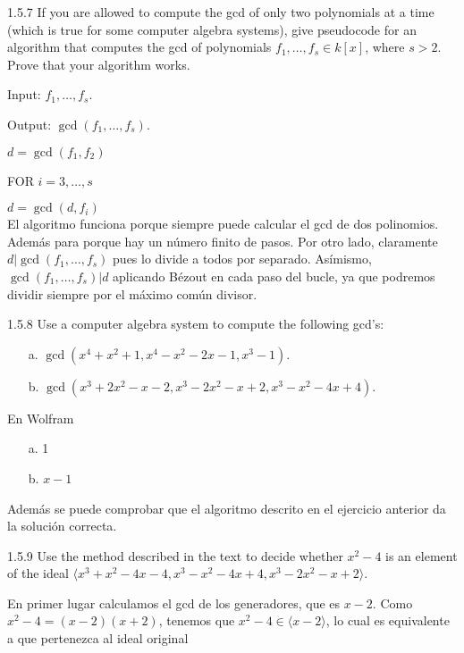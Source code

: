 \documentclass[twoside]{article}
\begin{document}
\newpage

\begin{ejercicio}{1.5.7}
If you are allowed to compute the gcd of only two polynomials at a time (which is true
for some computer algebra systems), give pseudocode for an algorithm that computes
the gcd of polynomials $f_1,\dots, f_s ∈ k[x]$, where $s > 2$. Prove that your algorithm works.
\end{ejercicio}
\begin{solucion}
Input: $f_1,\dots, f_s$.

Output: $\gcd(f_1,\dots, f_s)$.

$d=\gcd(f_1,f_2)$

FOR $i=3,\dots, s$

$d=\gcd(d,f_i)$\\

El algoritmo funciona porque siempre puede calcular el gcd de dos polinomios. Además para porque hay un número finito de pasos. Por otro lado, claramente $d |\gcd(f_1,\dots, f_s)$ pues lo divide a todos por separado. Asímismo, $\gcd(f_1,\dots, f_s)|d$ aplicando Bézout en cada paso del bucle, ya que podremos dividir siempre por el máximo común divisor. 


\end{solucion}

\newpage

\begin{ejercicio}{1.5.8}
Use a computer algebra system to compute the following gcd’s:
\begin{itemize}
\item[a.] $\gcd(x^4 + x^2 + 1, x^4 − x^2 − 2x − 1, x^3 − 1)$.
\item[b.] $\gcd(x^3 + 2x^2 − x − 2, x^3 − 2x^2 − x + 2, x^3 − x^2 − 4x + 4)$.
\end{itemize}
\end{ejercicio}

\begin{solucion}
En Wolfram
\begin{itemize}
\item[a.] 1
\item[b.]$x-1$
\end{itemize}
Además se puede comprobar que el algoritmo descrito en el ejercicio anterior da la solución correcta.
\end{solucion}
\newpage
\begin{ejercicio}{1.5.9}
Use the method described in the text to decide whether $x^2 − 4$ is an element of the ideal
$\langle x^3 + x^2 − 4x − 4, x^3 − x^2 − 4x + 4, x^3 − 2x^2 − x + 2\rangle$.
\end{ejercicio}
\begin{solucion}
En primer lugar calculamos el gcd de los generadores, que es $x-2$. Como $x^2-4=(x-2)(x+2)$, tenemos que $x^2-4\in \langle x-2\rangle$, lo cual es equivalente a que pertenezca al ideal original
\end{solucion}
\end{document}
